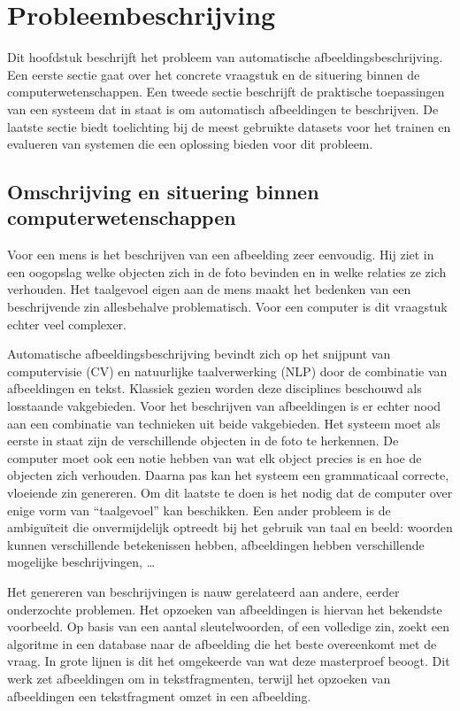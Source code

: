 \chapter{Probleembeschrijving}
\label{chap:Probleembeschrijving}
Dit hoofdstuk beschrijft het probleem van automatische afbeeldingsbeschrijving. Een eerste sectie gaat over het concrete vraagstuk en de situering binnen de computerwetenschappen. Een tweede sectie beschrijft de praktische toepassingen van een systeem dat in staat is om automatisch afbeeldingen te beschrijven. De laatste sectie biedt toelichting bij de meest gebruikte datasets voor het trainen en evalueren van systemen die een oplossing bieden voor dit probleem.

\section{Omschrijving en situering binnen computerwetenschappen}
\label{sec:Omschrijving en situering}
Voor een mens is het beschrijven van een afbeelding zeer eenvoudig. Hij ziet in een oogopslag welke objecten zich in de foto bevinden en in welke relaties ze zich verhouden. Het taalgevoel eigen aan de mens maakt het bedenken van een beschrijvende zin allesbehalve problematisch.
Voor een computer is dit vraagstuk echter veel complexer.

Automatische afbeeldingsbeschrijving bevindt zich op het snijpunt van computervisie (CV) en natuurlijke taalverwerking (NLP) door de combinatie van afbeeldingen en tekst. Klassiek gezien worden deze disciplines beschouwd als losstaande vakgebieden. Voor het beschrijven van afbeeldingen is er echter nood aan een combinatie van technieken uit beide vakgebieden. Het systeem moet als eerste in staat zijn de verschillende objecten in de foto te herkennen. De computer moet ook een notie hebben van wat elk object precies is en hoe de objecten zich verhouden. Daarna pas kan het systeem een grammaticaal correcte, vloeiende zin genereren. Om dit laatste te doen is het nodig dat de computer over enige vorm van ``taalgevoel'' kan beschikken. Een ander probleem is de ambigu\"iteit die onvermijdelijk optreedt bij het gebruik van taal en beeld: woorden kunnen verschillende betekenissen hebben, afbeeldingen hebben verschillende mogelijke beschrijvingen, \ldots

Het genereren van beschrijvingen is nauw gerelateerd aan andere, eerder onderzochte problemen. Het opzoeken van afbeeldingen is hiervan het bekendste voorbeeld. Op basis van een aantal sleutelwoorden, of een volledige zin, zoekt een algoritme in een database naar de afbeelding die het beste overeenkomt met de vraag. In grote lijnen is dit het omgekeerde van wat deze masterproef beoogt. Dit werk zet afbeeldingen om in tekstfragmenten, terwijl het opzoeken van afbeeldingen een tekstfragment omzet in een afbeelding.


